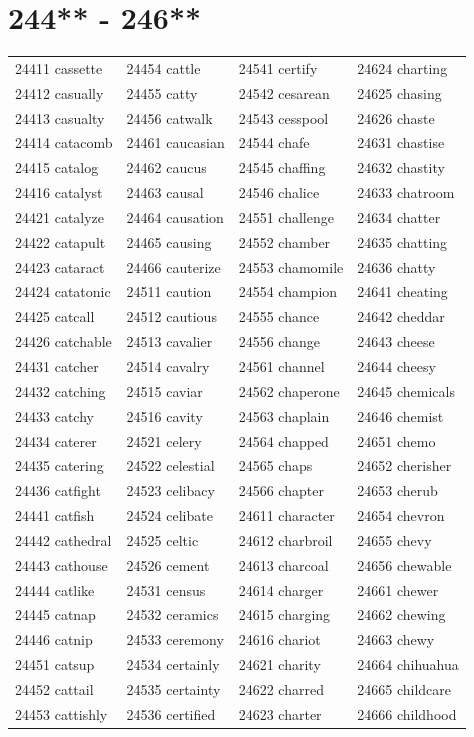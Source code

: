 \documentclass[10pt, oneside]{book}
\begin{document}
\begin{table}
	\centering
	\section*{244** - 246**}
	\begin{tabular}{l l l l}
24411 cassette &24454 cattle &24541 certify &24624 charting\\
24412 casually &24455 catty &24542 cesarean &24625 chasing\\
24413 casualty &24456 catwalk &24543 cesspool &24626 chaste\\
24414 catacomb &24461 caucasian &24544 chafe &24631 chastise\\
24415 catalog &24462 caucus &24545 chaffing &24632 chastity\\
24416 catalyst &24463 causal &24546 chalice &24633 chatroom\\
24421 catalyze &24464 causation &24551 challenge &24634 chatter\\
24422 catapult &24465 causing &24552 chamber &24635 chatting\\
24423 cataract &24466 cauterize &24553 chamomile &24636 chatty\\
24424 catatonic &24511 caution &24554 champion &24641 cheating\\
24425 catcall &24512 cautious &24555 chance &24642 cheddar\\
24426 catchable &24513 cavalier &24556 change &24643 cheese\\
24431 catcher &24514 cavalry &24561 channel &24644 cheesy\\
24432 catching &24515 caviar &24562 chaperone &24645 chemicals\\
24433 catchy &24516 cavity &24563 chaplain &24646 chemist\\
24434 caterer &24521 celery &24564 chapped &24651 chemo\\
24435 catering &24522 celestial &24565 chaps &24652 cherisher\\
24436 catfight &24523 celibacy &24566 chapter &24653 cherub\\
24441 catfish &24524 celibate &24611 character &24654 chevron\\
24442 cathedral &24525 celtic &24612 charbroil &24655 chevy\\
24443 cathouse &24526 cement &24613 charcoal &24656 chewable\\
24444 catlike &24531 census &24614 charger &24661 chewer\\
24445 catnap &24532 ceramics &24615 charging &24662 chewing\\
24446 catnip &24533 ceremony &24616 chariot &24663 chewy\\
24451 catsup &24534 certainly &24621 charity &24664 chihuahua\\
24452 cattail &24535 certainty &24622 charred &24665 childcare\\
24453 cattishly &24536 certified &24623 charter &24666 childhood\\
	\end{tabular}
 \end{table}
\clearpage
\end{document}
